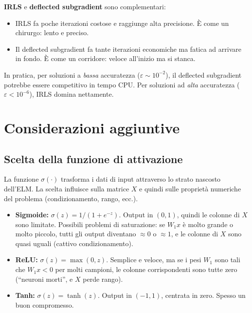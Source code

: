 \documentclass[a4paper,11pt]{article}
\theoremstyle{definition}
\begin{document}
\begin{riassunto}
\textbf{IRLS} e \textbf{deflected subgradient} sono complementari:
\begin{itemize}[nosep]
  \item IRLS fa poche iterazioni costose e raggiunge alta precisione. È come un chirurgo: lento e preciso.
  \item Il deflected subgradient fa tante iterazioni economiche ma fatica ad arrivare in fondo. È come un corridore: veloce all'inizio ma si stanca.
\end{itemize}
In pratica, per soluzioni a \emph{bassa} accuratezza ($\varepsilon \sim 10^{-2}$), il deflected subgradient potrebbe essere competitivo in tempo CPU. Per soluzioni ad \emph{alta} accuratezza ($\varepsilon < 10^{-6}$), IRLS domina nettamente.
\end{riassunto}

\section{Considerazioni aggiuntive}
\label{sec:extra}

\subsection{Scelta della funzione di attivazione}

\begin{intuizione}
La funzione $\sigma(\cdot)$ trasforma i dati di input attraverso lo strato nascosto dell'ELM. La scelta influisce sulla matrice $X$ e quindi sulle proprietà numeriche del problema (condizionamento, rango, ecc.).
\end{intuizione}

\begin{itemize}
  \item \textbf{Sigmoide:} $\sigma(z) = 1/(1+e^{-z})$. Output in $(0,1)$, quindi le colonne di $X$ sono limitate. Possibili problemi di saturazione: se $W_1x$ è molto grande o molto piccolo, tutti gli output diventano $\approx 0$ o $\approx 1$, e le colonne di $X$ sono quasi uguali (cattivo condizionamento).
  \item \textbf{ReLU:} $\sigma(z) = \max(0, z)$. Semplice e veloce, ma se i pesi $W_1$ sono tali che $W_1x < 0$ per molti campioni, le colonne corrispondenti sono tutte zero (``neuroni morti'', e $X$ perde rango).
  \item \textbf{Tanh:} $\sigma(z) = \tanh(z)$. Output in $(-1,1)$, centrata in zero. Spesso un buon compromesso.
\end{itemize}
\end{document}
